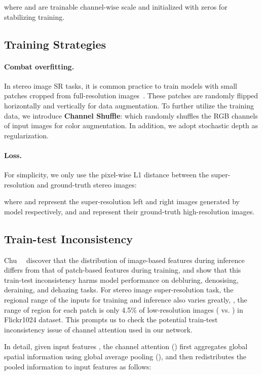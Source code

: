 \documentclass[10pt,twocolumn,letterpaper]{article}
\begin{document}
where  and  are trainable channel-wise scale and initialized with zeros for stabilizing training.


\subsection{Training Strategies}\label{sec:training}
\paragraph{Combat overfitting.} 
In stereo image SR tasks, it is common practice to train models with small patches cropped from full-resolution images~\cite{wang2019learning, wang2021symmetric, dai2021feedback}. These patches are randomly flipped horizontally and vertically for data augmentation. To further utilize the training data, we introduce \textbf{Channel Shuffle}: which randomly shuffles the RGB channels of input images for color augmentation. In addition, we adopt stochastic depth\cite{huang2016deep} as regularization.

\paragraph{Loss.}
For simplicity, we only use the pixel-wise L1 distance between the super-resolution and ground-truth stereo images:

where  and  represent the super-resolution left and right images generated by model respectively, and  and  represent their ground-truth high-resolution images. 

\subsection{Train-test Inconsistency}\label{sec:testing}
Chu~\etal~\cite{chu2021tlsc} discover that the distribution of image-based features during inference differs from that of patch-based features during training, and show that this train-test inconsistency harms model performance on debluring, denosising, deraining, and dehazing tasks.
For stereo image super-resolution task, the regional range of the inputs for training and inference also varies greatly, \eg, the range of region for each patch is only 4.5\% of low-resolution images ( vs. ) in Flickr1024 dataset.  
This prompts us to check the potential train-test inconsistency issue 
of channel attention used in our network. 

In detail, given input features , the channel attention () first aggregates global spatial information using global average pooling (), and then redistributes the pooled information to input features as follows:
\end{document}
